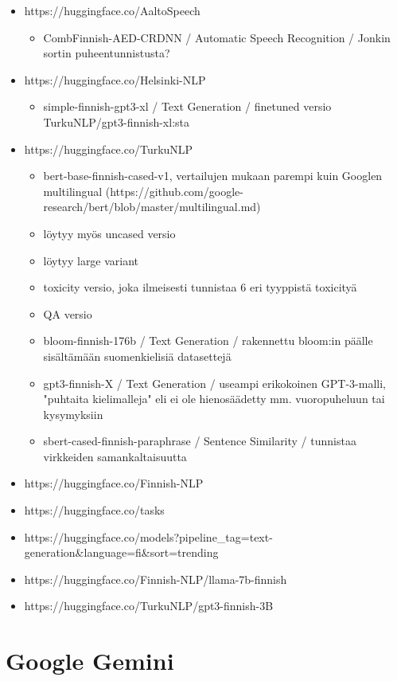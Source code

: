 \begin{itemize}
\begin{itemize}
  \end{itemize}
  \item https://huggingface.co/AaltoSpeech
  \begin{itemize}
    \item CombFinnish-AED-CRDNN / Automatic Speech Recognition / Jonkin sortin puheentunnistusta?
  \end{itemize}
  \item https://huggingface.co/Helsinki-NLP
  \begin{itemize}
    \item simple-finnish-gpt3-xl / Text Generation / finetuned versio TurkuNLP/gpt3-finnish-xl:sta
  \end{itemize}
  \item https://huggingface.co/TurkuNLP
  \begin{itemize}
    \item bert-base-finnish-cased-v1, vertailujen mukaan parempi kuin Googlen multilingual (https://github.com/google-research/bert/blob/master/multilingual.md)
    \item löytyy myös uncased versio
    \item löytyy large variant
    \item toxicity versio, joka ilmeisesti tunnistaa 6 eri tyyppistä toxicityä
    \item QA versio
    \item bloom-finnish-176b / Text Generation / rakennettu bloom:in päälle sisältämään suomenkielisiä datasettejä
    \item gpt3-finnish-X / Text Generation / useampi erikokoinen GPT-3-malli, "puhtaita kielimalleja" eli ei ole hienosäädetty mm. vuoropuheluun tai kysymyksiin
    \item sbert-cased-finnish-paraphrase / Sentence Similarity / tunnistaa virkkeiden samankaltaisuutta
  \end{itemize}
  \item https://huggingface.co/Finnish-NLP
  \item https://huggingface.co/tasks
  \item https://huggingface.co/models?pipeline\_tag=text-generation\&language=fi\&sort=trending
  \item https://huggingface.co/Finnish-NLP/llama-7b-finnish
  \item https://huggingface.co/TurkuNLP/gpt3-finnish-3B
\end{itemize}

\section{Google Gemini}

